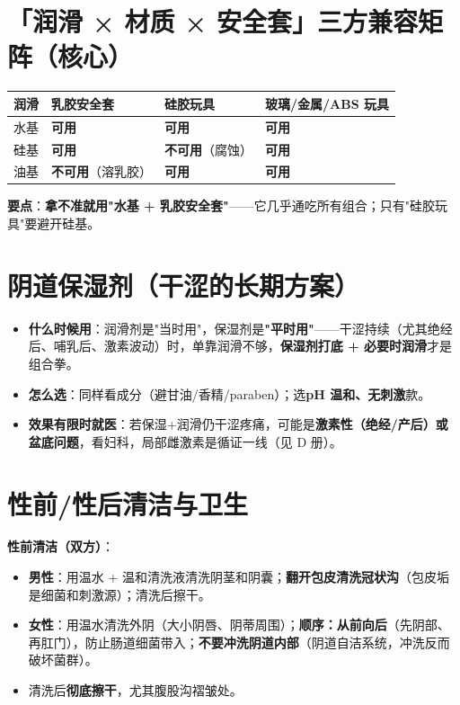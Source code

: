 \documentclass[12pt,UTF8,openany]{ctexbook}
\begin{document}
\section{「润滑 × 材质 × 安全套」三方兼容矩阵（核心）}
\begin{tabularx}{\textwidth}{X X X X}
\toprule
\textbf{润滑} & \textbf{乳胶安全套} & \textbf{硅胶玩具} & \textbf{玻璃/金属/ABS 玩具} \\
\midrule
水基 & \textbf{可用} & \textbf{可用} & \textbf{可用} \\
硅基 & \textbf{可用} & \textbf{不可用}（腐蚀） & \textbf{可用} \\
油基 & \textbf{不可用}（溶乳胶） & \textbf{可用} & \textbf{可用} \\
\bottomrule
\end{tabularx}
\par\smallskip
\textbf{要点}：\textbf{拿不准就用"水基 + 乳胶安全套"}——它几乎通吃所有组合；只有"硅胶玩具"要避开硅基。

\section{阴道保湿剂（干涩的长期方案）}
\begin{itemize}[leftmargin=2em,itemsep=0.3em]
  \item \textbf{什么时候用}：润滑剂是"当时用"，保湿剂是\textbf{"平时用"}——干涩持续（尤其绝经后、哺乳后、激素波动）时，单靠润滑不够，\textbf{保湿剂打底 + 必要时润滑}才是组合拳。
  \item \textbf{怎么选}：同样看成分（避甘油/香精/paraben）；选\textbf{pH 温和、无刺激}款。
  \item \textbf{效果有限时就医}：若保湿+润滑仍干涩疼痛，可能是\textbf{激素性（绝经/产后）或盆底问题}，看妇科，局部雌激素是循证一线（见 D 册）。
\end{itemize}

\section{性前/性后清洁与卫生}

\textbf{性前清洁（双方）}：

\begin{itemize}[leftmargin=2em,itemsep=0.3em]
  \item \textbf{男性}：用温水 + 温和清洗液清洗阴茎和阴囊；\textbf{翻开包皮清洗冠状沟}（包皮垢是细菌和刺激源）；清洗后擦干。
  \item \textbf{女性}：用温水清洗外阴（大小阴唇、阴蒂周围）；\textbf{顺序：从前向后}（先阴部、再肛门），防止肠道细菌带入；\textbf{不要冲洗阴道内部}（阴道自洁系统，冲洗反而破坏菌群）。
  \item 清洗后\textbf{彻底擦干}，尤其腹股沟褶皱处。
\end{itemize}
\end{document}
